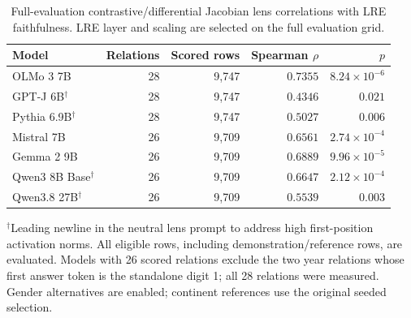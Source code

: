 \begin{table}[t]
\centering\small
\caption{Full-evaluation contrastive/differential Jacobian lens correlations with LRE faithfulness. LRE layer and scaling are selected on the full evaluation grid.}
\label{tab:full-models}
\begin{tabular}{@{}lrrrr@{}}
\toprule
Model & Relations & Scored rows & Spearman $\rho$ & $p$ \\
\midrule
OLMo 3 7B & 28 & 9,747 & $0.7355$ & $8.24\times10^{-6}$ \\
GPT-J 6B$^{\dagger}$ & 28 & 9,747 & $0.4346$ & $0.021$ \\
Pythia 6.9B$^{\dagger}$ & 28 & 9,747 & $0.5027$ & $0.006$ \\
Mistral 7B & 26 & 9,709 & $0.6561$ & $2.74\times10^{-4}$ \\
Gemma 2 9B & 26 & 9,709 & $0.6889$ & $9.96\times10^{-5}$ \\
Qwen3 8B Base$^{\dagger}$ & 26 & 9,709 & $0.6647$ & $2.12\times10^{-4}$ \\
Qwen3.8 27B$^{\dagger}$ & 26 & 9,709 & $0.5539$ & $0.003$ \\
\bottomrule
\end{tabular}
\par\smallskip\begin{minipage}{\linewidth}\footnotesize $^{\dagger}$Leading newline in the neutral lens prompt to address high first-position activation norms. All eligible rows, including demonstration/reference rows, are evaluated. Models with 26 scored relations exclude the two year relations whose first answer token is the standalone digit 1; all 28 relations were measured. Gender alternatives are enabled; continent references use the original seeded selection.\end{minipage}
\end{table}

